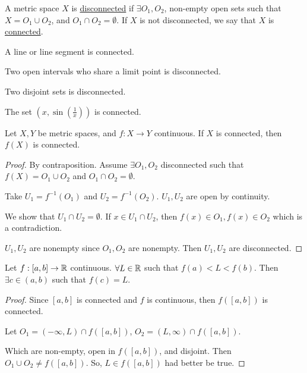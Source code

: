 \begin{definition}[Connectedness]
    A metric space $X$ is \ul{disconnected} if $\exists O_1, O_2$, non-empty open sets such that $X = O_1\cup O_2$, and $O_1\cap O_2 = \emptyset$. If $X$ is not disconnected, we say that $X$ is \ul{connected}.
\end{definition}

\begin{example}
    A line or line segment is connected.

    Two open intervals who share a limit point is disconnected.

    Two disjoint sets is disconnected.

    The set $\left( x, \sin\left(\frac{1}{x}\right) \right)$ is connected.
\end{example}

\begin{theorem}
    Let $X, Y$ be metric spaces, and $f : X\to Y$ continuous. If $X$ is connected, then $f(X)$ is connected.
\end{theorem}
\begin{proof}
    By contraposition. Assume $\exists O_1, O_2$ disconnected such that $f(X) = O_1\cup O_2$ and $O_1\cap O_2 = \emptyset$.

    Take $U_1 = f^{-1}(O_1)$ and $U_2 = f^{-1}(O_2)$. $U_1, U_2$ are open by continuity.

    We show that $U_1\cap U_2 = \emptyset$. If $x\in U_1\cap U_2$, then $f(x)\in O_1, f(x)\in O_2$ which is a contradiction.

    $U_1, U_2$ are nonempty since $O_1, O_2$ are nonempty. Then $U_1, U_2$ are disconnected.
\end{proof}

\begin{theorem}
    Let $f : [a, b]\to \mathbb R$ continuous. $\forall L\in \mathbb R$ such that $f(a) < L < f(b)$. Then $\exists c\in (a, b)$ such that $f(c) = L$.
\end{theorem}
\begin{proof}
    Since $[a, b]$ is connected and $f$ is continuous, then $f([a, b])$ is connected.

    Let $O_1 = (-\infty, L)\cap f([a,b])$, $O_2 = (L, \infty)\cap f([a, b])$.

    Which are non-empty, open in $f([a, b])$, and disjoint. Then $O_1\cup O_2 \neq f([a, b])$. So, $L\in f([a, b])$ had better be true.
\end{proof}


